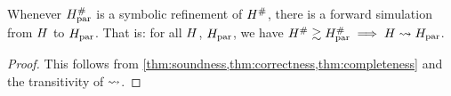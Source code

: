 {\begin{theorem}\label{thm:scheduler-correctness}
  Whenever $H_\text{par}^{\#}$ is a symbolic refinement of $H^{\#}$,
  there is a forward simulation from $H$ to $H_\text{par}$. That is: for all
  $H$, $H_\text{par}$, we have
  $H^{\#} \gtrsim H_\text{par}^{\#} \implies H \mathrel{\leadsto} H_\text{par}$.

  \begin{proof}
    This follows from \cref{thm:soundness,thm:correctness,thm:completeness} and
    the transitivity of $\mathrel{\leadsto}$.
  \end{proof}

%


\end{theorem}}
